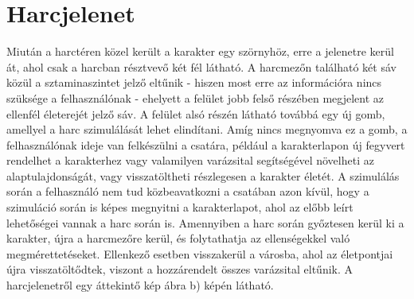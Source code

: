 \section{Harcjelenet}
\label{harcjelenet}
Miután a harctéren közel került a karakter egy szörnyhöz, erre a jelenetre kerül át, ahol csak a harcban résztvevő két fél látható. 
A harcmezőn található két sáv közül a sztaminaszintet jelző eltűnik - hiszen most erre az információra nincs szüksége a felhasználónak - ehelyett a felület jobb felső részében megjelent az ellenfél életerejét jelző sáv. 
A felület alsó részén látható továbbá egy új gomb, amellyel a harc szimulálását lehet elindítani. 
Amíg nincs megnyomva ez a gomb, a felhasználónak ideje van felkészülni a csatára, például a karakterlapon új fegyvert rendelhet a karakterhez vagy valamilyen varázsital segítségével növelheti az alaptulajdonságát, vagy visszatöltheti részlegesen a karakter életét. 
A szimulálás során a felhasználó nem tud közbeavatkozni a csatában azon kívül, hogy a szimuláció során is képes megnyitni a karakterlapot, ahol az előbb leírt lehetőségei vannak a harc során is. 
Amennyiben a harc során győztesen kerül ki a karakter, újra a harcmezőre kerül, és folytathatja az ellenségekkel való megmérettetéseket. 
Ellenkező esetben visszakerül a városba, ahol az életpontjai újra visszatöltődtek, viszont a hozzárendelt összes varázsital eltűnik. 
A harcjelenetről egy áttekintő kép  ábra b) képén látható. 
















